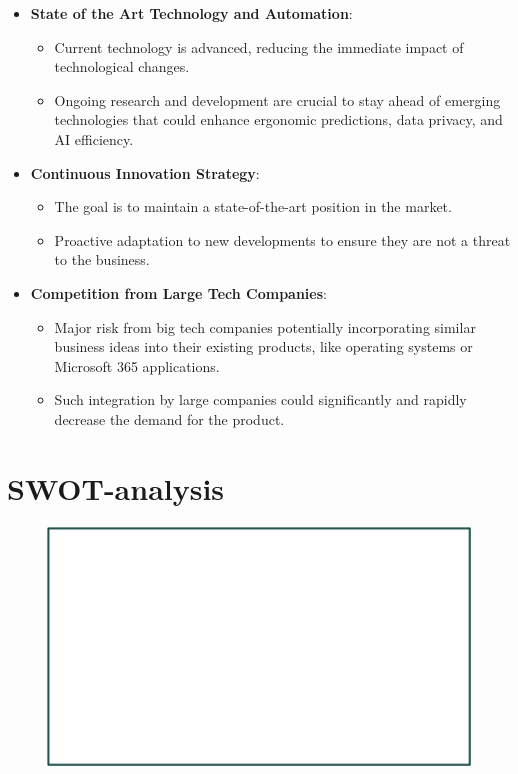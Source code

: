 \begin{itemize}
  \item \textbf{State of the Art Technology and Automation}:
  \begin{itemize}
    \item Current technology is advanced, reducing the immediate impact of technological changes.
    \item Ongoing research and development are crucial to stay ahead of emerging technologies that could enhance ergonomic predictions, data privacy, and AI efficiency.
  \end{itemize}

  \item \textbf{Continuous Innovation Strategy}:
  \begin{itemize}
    \item The goal is to maintain a state-of-the-art position in the market.
    \item Proactive adaptation to new developments to ensure they are not a threat to the business.
  \end{itemize}

  \item \textbf{Competition from Large Tech Companies}:
  \begin{itemize}
    \item Major risk from big tech companies potentially incorporating similar business ideas into their existing products, like operating systems or Microsoft 365 applications.
    \item Such integration by large companies could significantly and rapidly decrease the demand for the product.
  \end{itemize}
\end{itemize}

\section{SWOT-analysis}

\begin{figure}[h]
    \includegraphics[width=17.5cm]{SWOT_analysis.png}
\end{figure}

